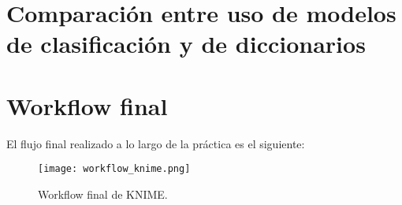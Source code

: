 \section{Comparación entre uso de modelos de clasificación y de diccionarios}


\section{Workflow final}


El flujo final realizado a lo largo de la práctica es el siguiente:

\begin{figure}[H]
	\centering
	\texttt{[image: workflow\_knime.png]}
	\caption{Workflow final de KNIME.}
	\label{fig:workflow_knime}
\end{figure}
